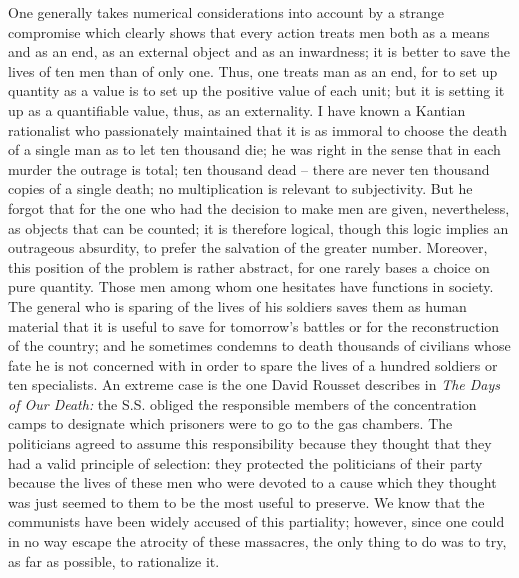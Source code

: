 \documentclass[11pt]{article}
\begin{document}
{{One generally takes numerical considerations into account by a strange compromise which clearly shows that every action treats men both as a means and as an end, as an external object and as an inwardness; it is better to save the lives of ten men than of only one. Thus, one treats man as an end, for to set up quantity as a value is to set up the positive value of each unit; but it is setting it up as a quantifiable value, thus, as an externality. I have known a Kantian rationalist who passionately maintained that it is as immoral to choose the death of a single man as to let ten thousand die; he was right in the sense that in each murder the outrage is total; ten thousand dead – there are never ten thousand copies of a single death; no multiplication is relevant to subjectivity. But he forgot that for the one who had the decision to make men are given, nevertheless, as objects that can be counted; it is therefore logical, though this logic implies an outrageous absurdity, to prefer the salvation of the greater number. Moreover, this position of the problem is rather abstract, for one rarely bases a choice on pure quantity. Those men among whom one hesitates have functions in society. The general who is sparing of the lives of his soldiers saves them as human material that it is useful to save for tomorrow’s battles or for the reconstruction of the country; and he sometimes condemns to death thousands of civilians whose fate he is not concerned with in order to spare the lives of a hundred soldiers or ten specialists. An extreme case is the one David Rousset describes in \textit{The Days of Our Death: }the S.S. obliged the responsible members of the concentration camps to designate which prisoners were to go to the gas chambers. The politicians agreed to assume this responsibility because they thought that they had a valid principle of selection: they protected the politicians of their party because the lives of these men who were devoted to a cause which they thought was just seemed to them to be the most useful to preserve. We know that the communists have been widely accused of this partiality; however, since one could in no way escape the atrocity of these massacres, the only thing to do was to try, as far as possible, to rationalize it.

}}
\end{document}
